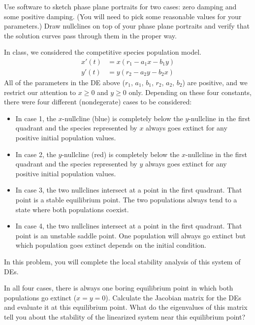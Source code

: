 \documentclass[boxes]{gsypset}
\begin{document}
\begin{problem}
\begin{subproblems}
\begin{solution}
				\end{solution}
			\subproblem 
				Use software to sketch phase plane portraits for two cases: 
				zero damping and some positive damping. 
				(You will need to pick some reasonable values for your parameters.) 
				Draw nullclines on top of your phase plane portraits and 
				verify that the solution curves pass through them in the proper way.
				\begin{solution}
					
				\end{solution}
		\end{subproblems}
	\end{problem}
	
	\begin{problem}
		In class, we considered the competitive species population model.
		\begin{align*}
			x'(t) &= x(r_1-a_1x-b_1y) \\
			y'(t) &= y(r_2-a_2y-b_2x)
		\end{align*} 
		All of the parameters in the DE above ($r_1$, $a_1$, $b_1$, $r_2$, $a_2$, $b_2$) are positive, 
		and we restrict our attention to $x\geq 0$ and $y\geq 0$ only. 
		Depending on these four constants, 
		there were four different (nondegerate) cases to be considered:
		\begin{itemize}
			\item 
				In case 1, the $x$-nullcline (blue) is completely below the
			  $y$-nullcline in the first quadrant and the species represented by
			  $x$ always goes extinct for any positive initial population values.
			\item 
				In case 2, the $y$-nullcline (red) is completely below the $x$-nullcline 
				in the first quadrant and the species represented by $y$ 
				always goes extinct for any positive initial population values.
			\item 
				In case 3, the two nullclines intersect at a point in the first quadrant. 
				That point is a stable equilibrium point. 
				The two populations always tend to a state where both populations coexist.
			\item 
				In case 4, the two nullclines intersect at a point in the first quadrant. 
				That point is an unstable saddle point. 
				One population will always go extinct but 
				which population goes extinct depends on the initial condition.
		\end{itemize}
		\hmcbreakproblem
		In this problem, you will complete the local stability analysis of this system of DEs.
		\begin{subproblems}
			\subproblem 
				In all four cases, there is always one boring equilibrium point in which 
				both populations go extinct ($x=y=0$). 
				Calculate the Jacobian matrix for the DEs and evaluate it at this equilibrium point. 
				What do the eigenvalues of this matrix tell you about 
				the stability of the linearized system near this equilibrium point?
				\begin{solution}
					

\end{solution}
\end{subproblems}
\end{problem}
\end{document}
